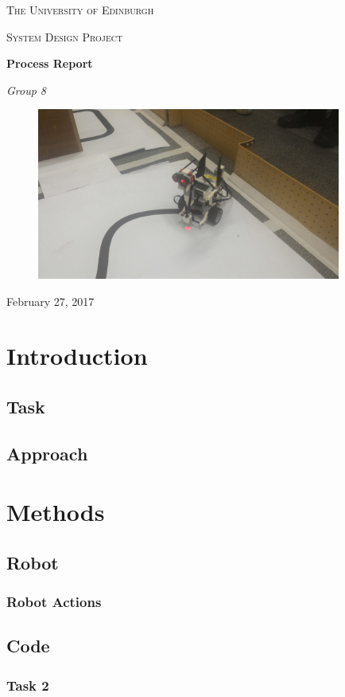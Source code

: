 \documentclass[a4paper,12pt]{article}
\begin{document}
\begin{titlepage}
	\centering
	{\scshape\LARGE The University of Edinburgh \par}
	\vspace{1cm}
	{\scshape\Large System Design Project\par}
	\vspace{1.5cm}
	{\huge\bfseries Process Report\par}
	\vspace{2cm}
	{\Large\itshape Group 8\par}
	\vfill
\begin{figure}[H]
    \centering
    \includegraphics[width=10cm]{robot}
    \label{fig:robot}
\end{figure}
	\vfill

	{\large February 27, 2017\par}
\end{titlepage}
\section{Introduction}

\subsection{Task}

\subsection{Approach}


\section{Methods}
\subsection{Robot}

\subsubsection{Robot Actions}

\subsection{Code}
\subsubsection{Task 2}
\end{document}
